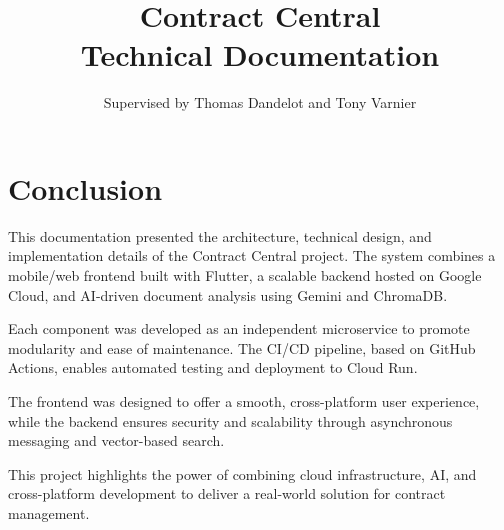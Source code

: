 \documentclass[a4paper,12pt]{report}
\begin{document}
\title{
    \textbf{Contract Central}\\
    Technical Documentation
}

\makeatletter
\def\@author{
    M1 Software Development \& Big Data -- ISEN Toulon\\
    \textbf{Academic Year:} 2024--2025\\
    \textbf{Team Members:}\\
    Capucine Debailleul (Project Manager)\\
    Alexis Dutaud\\
    Fabio Sintoni\\
    Larry Jason Tueno
}
\makeatother


\date{Supervised by Thomas Dandelot and Tony Varnier}

\maketitle
\tableofcontents
\newpage





\chapter*{Conclusion}

This documentation presented the architecture, technical design, and implementation details of the Contract Central project. The system combines a mobile/web frontend built with Flutter, a scalable backend hosted on Google Cloud, and AI-driven document analysis using Gemini and ChromaDB.

Each component was developed as an independent microservice to promote modularity and ease of maintenance. The CI/CD pipeline, based on GitHub Actions, enables automated testing and deployment to Cloud Run.

The frontend was designed to offer a smooth, cross-platform user experience, while the backend ensures security and scalability through asynchronous messaging and vector-based search.

This project highlights the power of combining cloud infrastructure, AI, and cross-platform development to deliver a real-world solution for contract management.
\end{document}
